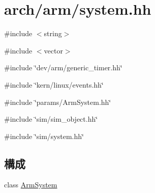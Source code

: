 \hypertarget{arch_2arm_2system_8hh}{
\section{arch/arm/system.hh}
\label{arch_2arm_2system_8hh}
}
{\ttfamily \#include $<$string$>$}\par
{\ttfamily \#include $<$vector$>$}\par
{\ttfamily \#include \char`\"{}dev/arm/generic\_\-timer.hh\char`\"{}}\par
{\ttfamily \#include \char`\"{}kern/linux/events.hh\char`\"{}}\par
{\ttfamily \#include \char`\"{}params/ArmSystem.hh\char`\"{}}\par
{\ttfamily \#include \char`\"{}sim/sim\_\-object.hh\char`\"{}}\par
{\ttfamily \#include \char`\"{}sim/system.hh\char`\"{}}\par
\subsection*{構成}
\begin{DoxyCompactItemize}
\item 
class \hyperlink{classArmSystem}{ArmSystem}
\end{DoxyCompactItemize}
